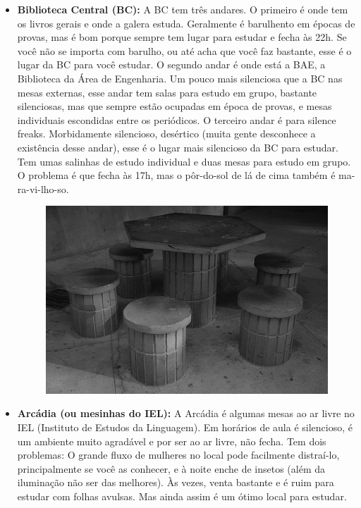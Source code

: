 \begin{itemize}
    \item  \textbf{Biblioteca Central (BC):} A BC tem três andares. O primeiro
    é onde tem os livros gerais e onde a galera estuda. Geralmente é barulhento em
    épocas de provas, mas é bom porque sempre tem lugar para estudar e fecha às 22h.
    Se você não se importa com barulho, ou até acha que você faz bastante, esse
    é o lugar da BC para você estudar. O segundo andar é onde está a BAE,
    a Biblioteca da Área de Engenharia. Um pouco mais silenciosa que a BC nas mesas
    externas, esse andar tem salas para estudo em grupo, bastante silenciosas, mas
    que sempre estão ocupadas em época de provas, e mesas individuais escondidas
    entre os periódicos. O terceiro andar é para silence freaks. Morbidamente
    silencioso, desértico (muita gente desconhece a existência desse andar), esse
    é o lugar mais silencioso da BC para estudar. Tem umas salinhas de estudo
    individual e duas mesas para estudo em grupo. O problema é que fecha às 17h, mas
    o pôr-do-sol de lá de cima também é ma-ra-vi-lho-so.

    \begin{figure}[h!]
        \centering
        \includegraphics[scale=0.60, keepaspectratio=true]{img/imgs/11-lugares_estudar/-072.jpg}
    \end{figure}

    \item  \textbf{Arcádia (ou mesinhas do IEL):} A Arcádia é algumas mesas ao ar
    livre no IEL (Instituto de Estudos da Linguagem). Em horários de aula
    é silencioso, é um ambiente muito agradável e por ser ao ar livre, não fecha.
    Tem dois problemas: O grande fluxo de mulheres no local pode facilmente
    distraí-lo, principalmente se você as conhecer, e à noite enche de insetos (além
    da iluminação não ser das melhores). Às vezes, venta bastante e é ruim para
    estudar com folhas avulsas. Mas ainda assim é um ótimo local para estudar.


\end{itemize}
